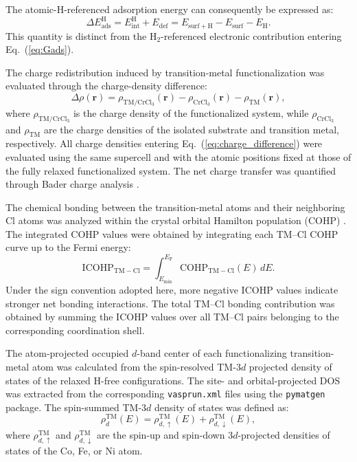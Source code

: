 \documentclass[journal=jacsat,manuscript=article]{achemso}
\begin{document}
The atomic-H-referenced adsorption energy can consequently be expressed as:
\begin{equation}
    \Delta E_{\mathrm{ads}}^{\mathrm{H}}
    =
    E_{\mathrm{int}}^{\mathrm{H}}
    +
    E_{\mathrm{def}}
    =
    E_{\mathrm{surf+H}}
    -
    E_{\mathrm{surf}}
    -
    E_{\mathrm{H}}.
    \label{eq:Eads_atomic}
\end{equation}
This quantity is distinct from the H$_2$-referenced electronic contribution entering Eq.~(\ref{eq:Gads}).

The charge redistribution induced by transition-metal functionalization was evaluated through the charge-density difference:
\begin{equation}
    \Delta \rho(\mathbf{r})
    =
    \rho_{\mathrm{TM/CrCl_3}}(\mathbf{r})
    -
    \rho_{\mathrm{CrCl_3}}(\mathbf{r})
    -
    \rho_{\mathrm{TM}}(\mathbf{r}),
    \label{eq:charge_difference}
\end{equation}
where $\rho_{\mathrm{TM/CrCl_3}}$ is the charge density of the functionalized system, while $\rho_{\mathrm{CrCl_3}}$ and $\rho_{\mathrm{TM}}$ are the charge densities of the isolated substrate and transition metal, respectively. All charge densities entering Eq.~(\ref{eq:charge_difference}) were evaluated using the same supercell and with the atomic positions fixed at those of the fully relaxed functionalized system. The net charge transfer was quantified through Bader charge analysis \cite{Henkelman2006,Tang_2009, SANVILLEJCC2007, YUJPCP2011}.

The chemical bonding between the transition-metal atoms and their neighboring Cl atoms was analyzed within the crystal orbital Hamilton population (COHP)  \cite{Dronskowki2002}. The integrated COHP values were obtained by integrating each TM--Cl COHP curve up to the Fermi energy:
\begin{equation}
    \mathrm{ICOHP}_{\mathrm{TM-Cl}}
    =
    \int_{E_{\min}}^{E_{\mathrm{F}}}
    \mathrm{COHP}_{\mathrm{TM-Cl}}(E)\,dE.
    \label{eq:ICOHP}
\end{equation}
Under the sign convention adopted here, more negative ICOHP values indicate stronger net bonding interactions. The total TM--Cl bonding contribution was obtained by summing the ICOHP values over all TM--Cl pairs belonging to the corresponding coordination shell.

The atom-projected occupied $d$-band center of each functionalizing transition-metal atom was calculated from the spin-resolved TM-$3d$ projected density of states of the relaxed H-free configurations. The site- and orbital-projected DOS was extracted from the corresponding \texttt{vasprun.xml} files using the \texttt{pymatgen} package. The spin-summed TM-$3d$ density of states was defined as:
\begin{equation}
    \rho_{d}^{\mathrm{TM}}(E)
    =
    \rho_{d,\uparrow}^{\mathrm{TM}}(E)
    +
    \rho_{d,\downarrow}^{\mathrm{TM}}(E),
    \label{eq:spin_summed_dos}
\end{equation}
where $\rho_{d,\uparrow}^{\mathrm{TM}}$ and
$\rho_{d,\downarrow}^{\mathrm{TM}}$ are the spin-up and
spin-down $3d$-projected densities of states of the Co, Fe,
or Ni atom.
\end{document}

